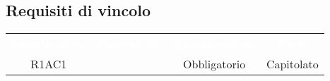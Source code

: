 \renewcommand{\o}{Obbligatorio}
\renewcommand{\d}{Desiderabile}
\newcommand{\op}{Opzionale}
\subsection{Requisiti di vincolo}
{
\renewcommand{\arraystretch}{1.5}
\centering
\begin{longtable}{ c C{4cm} c c}
\textcolor{white}{\textbf{Identificativo}} & \textcolor{white}{\textbf{Descrizione}} & \textcolor{white}{\textbf{Classificazione}} & \textcolor{white}{\textbf{Fonti}}\\	

R1AC1 &  & Obbligatorio & Capitolato\\

\end{longtable}
}